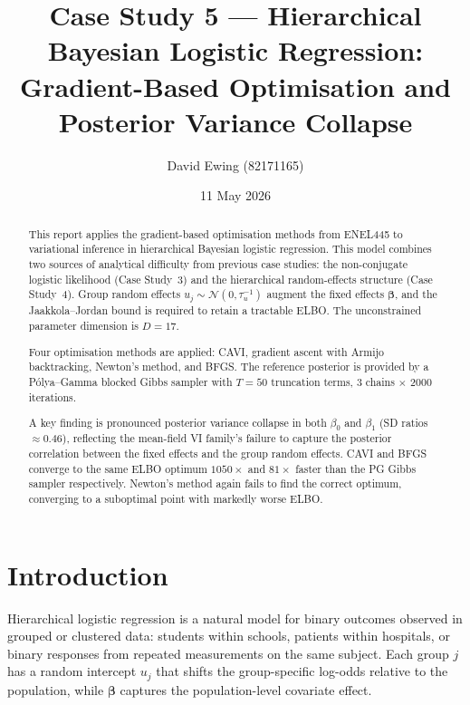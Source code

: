 \documentclass[11pt,a4paper]{article}
\title{
Case Study 5 --- Hierarchical Bayesian Logistic Regression:\\[0.4em]
Gradient-Based Optimisation and Posterior Variance Collapse
}
\author{
  David Ewing (82171165)
}
\date{11 May 2026}
\begin{document}
\maketitle

\begin{abstract}
\setlength{\parindent}{0pt}
\setlength{\parskip}{0.7em}

This report applies the gradient-based optimisation methods from ENEL445 to variational
inference in hierarchical Bayesian logistic regression.
This model combines two sources of analytical difficulty from previous case studies:
the non-conjugate logistic likelihood (Case Study~3) and the hierarchical random-effects
structure (Case Study~4).
Group random effects $u_j \sim \mathcal{N}(0,\tau_u^{-1})$ augment the fixed effects
$\bm{\beta}$, and the Jaakkola--Jordan \parencite{Jaakkola2000} bound is required to
retain a tractable ELBO.
The unconstrained parameter dimension is $D=17$.

Four optimisation methods are applied: CAVI, gradient ascent with Armijo backtracking,
Newton's method, and BFGS.
The reference posterior is provided by a P\'{o}lya--Gamma blocked Gibbs sampler
\parencite{Polson2013} with $T=50$ truncation terms, 3 chains $\times$ 2000 iterations.

A key finding is pronounced posterior variance collapse in both $\beta_0$ and $\beta_1$
(SD ratios $\approx 0.46$), reflecting the mean-field VI family's failure to capture
the posterior correlation between the fixed effects and the group random effects.
CAVI and BFGS converge to the same ELBO optimum $1050\times$ and $81\times$ faster
than the PG Gibbs sampler respectively.
Newton's method again fails to find the correct optimum, converging to a suboptimal
point with markedly worse ELBO.

\end{abstract}

\newpage

\section*{Introduction}

Hierarchical logistic regression is a natural model for binary outcomes observed in
grouped or clustered data: students within schools, patients within hospitals, or
binary responses from repeated measurements on the same subject.
Each group $j$ has a random intercept $u_j$ that shifts the group-specific log-odds
relative to the population, while $\bm{\beta}$ captures the population-level
covariate effect.
\end{document}
